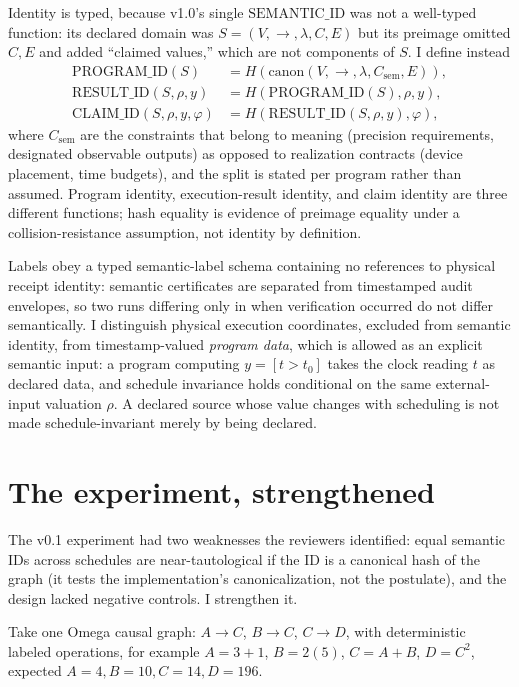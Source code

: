\documentclass[11pt]{article}
\begin{document}
Identity is typed, because v1.0's single $\mathrm{SEMANTIC\_ID}$ was not a well-typed function: its declared domain was $S = (V, \to, \lambda, C, E)$ but its preimage omitted $C, E$ and added ``claimed values,'' which are not components of $S$. I define instead
\begin{align*}
\mathrm{PROGRAM\_ID}(S) &= H(\mathrm{canon}(V, \to, \lambda, C_{\mathrm{sem}}, E)), \\
\mathrm{RESULT\_ID}(S, \rho, y) &= H(\mathrm{PROGRAM\_ID}(S), \rho, y), \\
\mathrm{CLAIM\_ID}(S, \rho, y, \varphi) &= H(\mathrm{RESULT\_ID}(S, \rho, y), \varphi),
\end{align*}
where $C_{\mathrm{sem}}$ are the constraints that belong to meaning (precision requirements, designated observable outputs) as opposed to realization contracts (device placement, time budgets), and the split is stated per program rather than assumed. Program identity, execution-result identity, and claim identity are three different functions; hash equality is evidence of preimage equality under a collision-resistance assumption, not identity by definition.

Labels obey a typed semantic-label schema containing no references to physical receipt identity: semantic certificates are separated from timestamped audit envelopes, so two runs differing only in when verification occurred do not differ semantically. I distinguish physical execution coordinates, excluded from semantic identity, from timestamp-valued \textit{program data}, which is allowed as an explicit semantic input: a program computing $y = [t > t_0]$ takes the clock reading $t$ as declared data, and schedule invariance holds conditional on the same external-input valuation $\rho$. A declared source whose value changes with scheduling is not made schedule-invariant merely by being declared.

\section{The experiment, strengthened}

The v0.1 experiment had two weaknesses the reviewers identified: equal semantic IDs across schedules are near-tautological if the ID is a canonical hash of the graph (it tests the implementation's canonicalization, not the postulate), and the design lacked negative controls. I strengthen it.

Take one Omega causal graph: $A \to C$, $B \to C$, $C \to D$, with deterministic labeled operations, for example $A = 3+1$, $B = 2(5)$, $C = A+B$, $D = C^2$, expected $A=4, B=10, C=14, D=196$.
\end{document}
